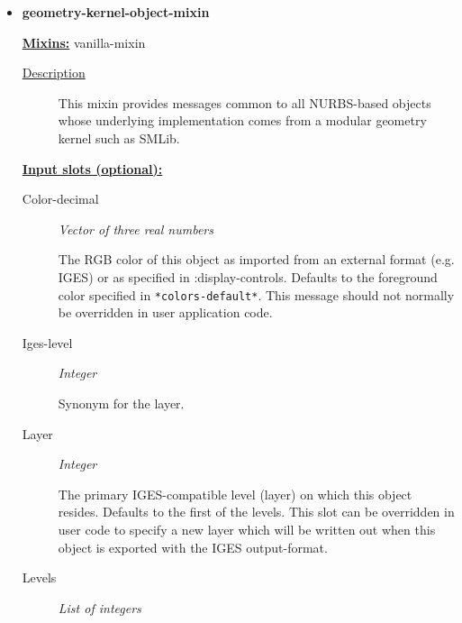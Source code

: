 \documentclass [11pt]{book}
\begin{document}
\begin{itemize}
\item {}
\label{prim:geometry-kernel-object-mixin}
\textbf{geometry-kernel-object-mixin}


\textbf{
\underline{Mixins:}} vanilla-mixin





\begin{description}

\item [
\underline{Description}]


This mixin provides messages common to all NURBS-based objects whose underlying implementation
comes from a modular geometry kernel such as SMLib.



\end{description}








\textbf{
\underline{Input slots (optional):}}

\begin{description}

\item [Color-decimal]
\emph{Vector of three real numbers}

 The RGB color of this object as imported from an external format (e.g. IGES) or as specified in :display-controls.
Defaults to the foreground color specified in \texttt{*colors-default*}. This message should not normally be overridden in user application code.




\item [Iges-level]
\emph{Integer}

 Synonym for the layer.




\item [Layer]
\emph{Integer}

 The primary IGES-compatible level (layer) on which this object resides. Defaults to the first of the levels. This
slot can be overridden in user code to specify a new layer which will be written out when this object is exported with the IGES
output-format.




\item [Levels]
\emph{List of integers}


\end{description}
\end{itemize}
\end{document}
